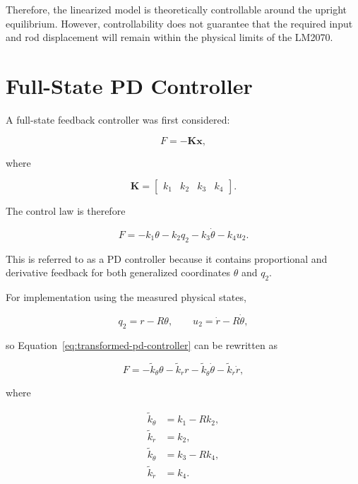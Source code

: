 Therefore, the linearized model is theoretically controllable around the upright equilibrium. However, controllability does not guarantee that the required input and rod displacement will remain within the physical limits of the LM2070.

\section{Full-State PD Controller}
\label{sec:full-state-pd}

A full-state feedback controller was first considered:

\begin{equation}
F=-\mathbf{K}\mathbf{x},
\label{eq:state-feedback-controller}
\end{equation}

where

\begin{equation}
\mathbf{K}
=
\begin{bmatrix}
k_1 & k_2 & k_3 & k_4
\end{bmatrix}.
\end{equation}

The control law is therefore

\begin{equation}
F
=
-k_1\theta
-k_2q_2
-k_3\dot{\theta}
-k_4u_2.
\label{eq:transformed-pd-controller}
\end{equation}

This is referred to as a PD controller because it contains proportional and derivative feedback for both generalized coordinates $\theta$ and $q_2$.

For implementation using the measured physical states,

\begin{equation}
q_2=r-R\theta,
\qquad
u_2=\dot{r}-R\dot{\theta},
\end{equation}

so Equation~\eqref{eq:transformed-pd-controller} can be rewritten as

\begin{equation}
F
=
-\widetilde{k}_{\theta}\theta
-\widetilde{k}_{r}r
-\widetilde{k}_{\dot{\theta}}\dot{\theta}
-\widetilde{k}_{\dot{r}}\dot{r},
\label{eq:physical-pd-controller}
\end{equation}

where

\begin{equation}
\begin{aligned}
\widetilde{k}_{\theta} &= k_1-Rk_2, \\
\widetilde{k}_{r} &= k_2, \\
\widetilde{k}_{\dot{\theta}} &= k_3-Rk_4, \\
\widetilde{k}_{\dot{r}} &= k_4.
\end{aligned}
\label{eq:gain-coordinate-conversion}
\end{equation}

